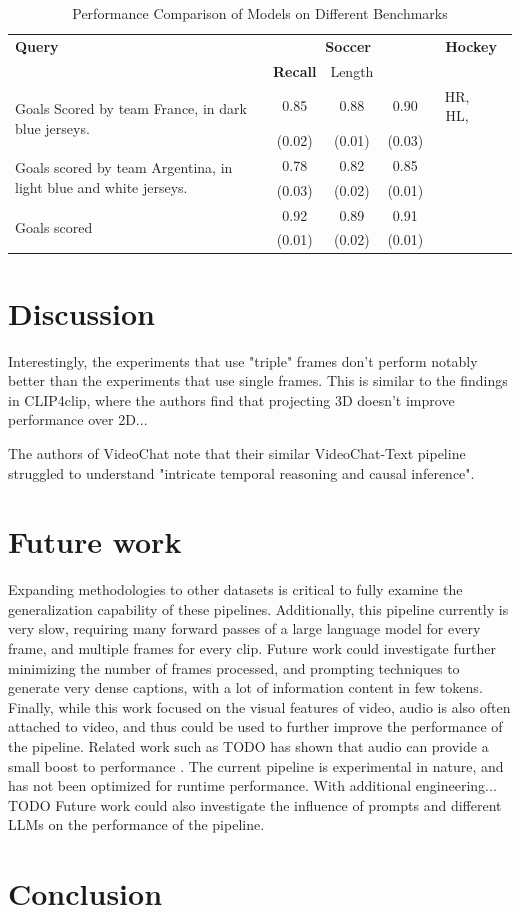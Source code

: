 \documentclass{article}
\begin{document}
\begin{table}[htbp]
  \centering
  \begin{tabular}{lccccc}
    \toprule
    \textbf{Query} & \multicolumn{3}{c}{\textbf{Soccer}} & \multicolumn{3}{c}{\textbf{Hockey}}\\
    \cmidrule(lr){2-4}
    & \textbf{Recall} & Length \\
    \midrule
    \multirow{2}{*}{Goals Scored by team France, in dark blue jerseys.} & 0.85 & 0.88 & 0.90 & HR, HL, \\
    & (0.02) & (0.01) & (0.03) \\
    \midrule
    \multirow{2}{*}{Goals scored by team Argentina, in light blue and white jerseys.} & 0.78 & 0.82 & 0.85 \\
    & (0.03) & (0.02) & (0.01) \\
    \midrule
    \multirow{2}{*}{Goals scored} & 0.92 & 0.89 & 0.91 \\
    & (0.01) & (0.02) & (0.01) \\
    \bottomrule
  \end{tabular}
  \label{tab:video_summarization}
  \caption{Performance Comparison of Models on Different Benchmarks}
\end{table}

\section{Discussion}

Interestingly, the experiments that use "triple" frames don't perform notably better than the experiments that use single frames.
This is similar to the findings in CLIP4clip, where the authors find that projecting 3D doesn't improve performance over 2D...

The authors of VideoChat note that their similar VideoChat-Text pipeline struggled to understand "intricate temporal reasoning and causal inference".

\section{Future work}

Expanding methodologies to other datasets is critical to fully examine the generalization capability of these pipelines.
Additionally, this pipeline currently is very slow, requiring many forward passes of a large language model for every frame, and multiple frames for every clip.
Future work could investigate further minimizing the number of frames processed, and prompting techniques to generate very dense captions, with a lot of information content in few tokens.
Finally, while this work focused on the visual features of video, audio is also often attached to video, and thus could be used to further improve the performance of the pipeline.
Related work such as TODO has shown that audio can provide a small boost to performance \cite{TODO}.
The current pipeline is experimental in nature, and has not been optimized for runtime performance. With additional engineering... TODO
Future work could also investigate the influence of prompts and different LLMs on the performance of the pipeline.

\section{Conclusion}



\end{document}
